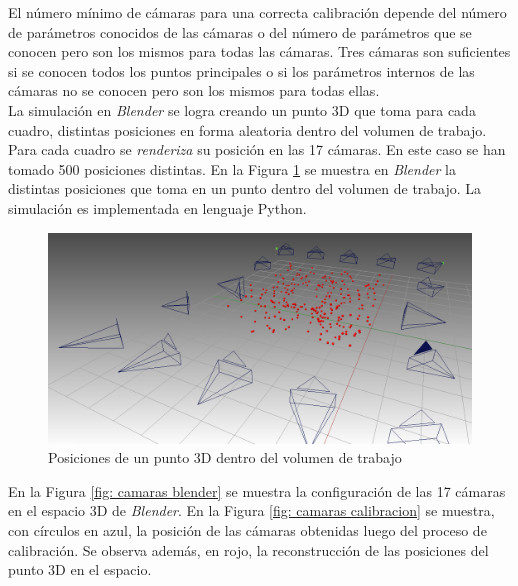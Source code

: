 El número mínimo de cámaras para una correcta calibración depende del número de parámetros conocidos de las cámaras o del número de parámetros que se conocen pero son los mismos para todas las cámaras. Tres cámaras son suficientes si se conocen todos los puntos principales o si los parámetros internos de las cámaras no se conocen pero son los mismos para todas ellas.\\

La simulación en \emph{Blender} se logra creando un punto 3D que toma para cada cuadro, distintas posiciones en forma aleatoria dentro del volumen de trabajo. Para cada cuadro se \textit{renderiza} su posición en las 17 cámaras. En este caso se han tomado 500 posiciones distintas. En la Figura \ref{fig: blender toolbox laser} se muestra en \emph{Blender} la distintas posiciones que toma en un punto dentro del volumen de trabajo. La simulación es implementada en lenguaje Python.

\begin{figure}[ht!]
\begin{center}
\includegraphics[scale=0.22]{img/calibracion/blender_toolbox_laser.png}
\end{center}
\caption{Posiciones de un punto 3D dentro del volumen de trabajo}
\label{fig: blender toolbox laser}
\end{figure}

En la Figura \ref{fig: camaras blender} se muestra la configuración de las 17 cámaras en el espacio 3D de \emph{Blender}. En la Figura \ref{fig: camaras calibracion} se muestra, con círculos en azul, la posición de las cámaras obtenidas luego del proceso de calibración. Se observa además, en rojo, la reconstrucción de las posiciones del punto 3D en el espacio. 


